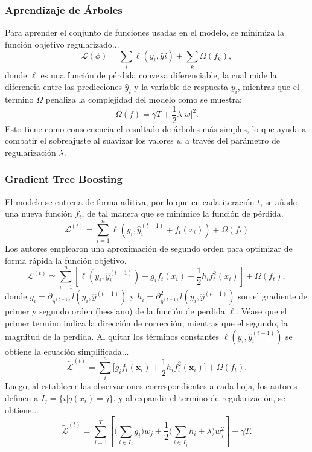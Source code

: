 \documentclass[12pt,letterpaper]{article}
\begin{document}
\subsubsection{Aprendizaje de Árboles}
Para aprender el conjunto de funciones usadas en el modelo, se minimiza la función objetivo regularizado...
\begin{equation}
\mathcal{L}(\phi) = \sum_i \ell(y_i, \hat{y}i) + \sum_k \Omega(f_k),
\end{equation}
donde  $\ell$ es una función de pérdida convexa diferenciable, la cual mide la diferencia entre las predicciones $\hat{y}_i$ y la variable de respuesta $y_i$, mientras que el termino $\Omega$ penaliza la complejidad del modelo como se muestra:
\begin{equation}
\Omega(f) = \gamma T + \frac{1}{2} \lambda |w|^2.
\end{equation}
Esto tiene como consecuencia el resultado de árboles más simples, lo que ayuda a combatir el sobreajuste al suavizar los valores $w$ a través del parámetro de regularización $\lambda$.

\subsubsection{Gradient Tree Boosting}
El modelo se entrena de forma aditiva, por lo que en cada iteración $t$, se añade una nueva función $f_t$, de tal manera que se minimice la función de pérdida.
\begin{equation}
\mathcal{L}^{(t)} = \sum_{i=1}^{n} \ell(y_i, \hat{y}_i^{(t-1)} + f_t(x_i)) + \Omega(f_t)
\end{equation}
Los autores \cite{chen2016xgboost} emplearon una aproximación de segundo orden para optimizar de forma rápida la función objetivo. 
\begin{equation}
\mathcal{L}^{(t)} \simeq \sum_{i=1}^{n} \left[ \ell(y_i, \hat{y}_i^{(t-1)}) + g_i f_t(x_i) + \frac{1}{2} h_i f_t^2(x_i) \right] + \Omega(f_t),
\end{equation}
donde $g_i= \partial_{\hat{y}^{(t-1)}} l(y_i, \hat{y}^{(t-1)})$ y $h_i=\partial^2_{\hat{y}^{(t-1)}} l(y_i, \hat{y}^{(t-1)})$ son el gradiente de primer y segundo orden (hessiano) de la función de perdida $\ell$.  Véase que el primer termino indica la dirección de corrección, mientras que el segundo, la magnitud de la perdida. Al quitar los términos constantes $\ell(y_i, \hat{y}_i^{(t-1)})$ se obtiene la ecuación simplificada...
\begin{equation}
    \tilde{\mathcal{L}}^{(t)}=\sum_i^n\big[ g_i f_t(\textbf{x}_i) + \frac{1}{2}h_i f_t^2(\textbf{x}_i) \big] +\Omega(f_t).
\end{equation}
Luego, al establecer las observaciones correspondientes a cada hoja, los autores \cite{chen2016xgboost} definen a $I_j= \{i|q(x_i)=j \}$, y al expandir el termino de regularización, se obtiene...
\begin{equation}
\tilde{\mathcal{L}}^{(t)} = \sum_{j=1}^{T} \left[ \bigg( \sum_{i \in I_j} g_i \bigg) w_j + \frac{1}{2} \bigg( \sum_{i \in I_j} h_i + \lambda \bigg) w_j^2 \right] + \gamma T.
\end{equation}
\end{document}

